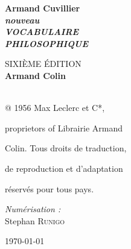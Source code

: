 \begin{titlepage}
%

\begin{flushright}
{\large {\bf Armand Cuvillier}}\\[1.9cm]

{\Large \textbf{\textit {nouveau}}}\\[0.5cm]

{\huge \textbf{\textit {VOCABULAIRE}}  \\[0.5cm]
\textbf{\textit {PHILOSOPHIQUE}}\\[1.1cm] }

{\normalsize SIXIÈME ÉDITION}\\[0.5cm]

\vfill
{\large {\bf Armand Colin}\\[0.5cm]
{}}\\[0.5cm]

\vfill
\end{flushright}
@ 1956 Max Leclerc et C*,

proprietors of Librairie Armand

Colin. Tous droits de traduction,

de reproduction et d'adaptation

réservés pour tous pays.

\vfill

\begin{minipage}{0.4\textwidth}
\begin{flushleft} \large
\emph{Numérisation :}\\
Stephan \textsc{Runigo}
\end{flushleft}
\end{minipage}
\begin{minipage}{0.4\textwidth}
\begin{flushright} 
\end{flushright}
\end{minipage}

\vfill

{\large \today}

\end{titlepage}
